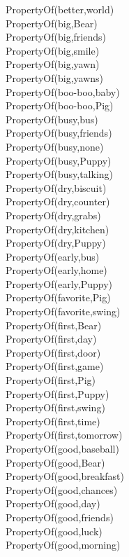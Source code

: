 \begin{multicols}{2}
\begin{footnotesize}
PropertyOf(better,world) \\
PropertyOf(big,Bear) \\
PropertyOf(big,friends) \\
PropertyOf(big,smile) \\
PropertyOf(big,yawn) \\
PropertyOf(big,yawns) \\
PropertyOf(boo-boo,baby) \\
PropertyOf(boo-boo,Pig) \\
PropertyOf(busy,bus) \\
PropertyOf(busy,friends) \\
PropertyOf(busy,none) \\
PropertyOf(busy,Puppy) \\
PropertyOf(busy,talking) \\
PropertyOf(dry,biscuit) \\
PropertyOf(dry,counter) \\
PropertyOf(dry,grabs) \\
PropertyOf(dry,kitchen) \\
PropertyOf(dry,Puppy) \\
PropertyOf(early,bus) \\
PropertyOf(early,home) \\
PropertyOf(early,Puppy) \\
PropertyOf(favorite,Pig) \\
PropertyOf(favorite,swing) \\
PropertyOf(first,Bear) \\
PropertyOf(first,day) \\
PropertyOf(first,door) \\
PropertyOf(first,game) \\
PropertyOf(first,Pig) \\
PropertyOf(first,Puppy) \\
PropertyOf(first,swing) \\
PropertyOf(first,time) \\
PropertyOf(first,tomorrow) \\
PropertyOf(good,baseball) \\
PropertyOf(good,Bear) \\
PropertyOf(good,breakfast) \\
PropertyOf(good,chances) \\
PropertyOf(good,day) \\
PropertyOf(good,friends) \\
PropertyOf(good,luck) \\
PropertyOf(good,morning) \\

\end{footnotesize}
\end{multicols}

